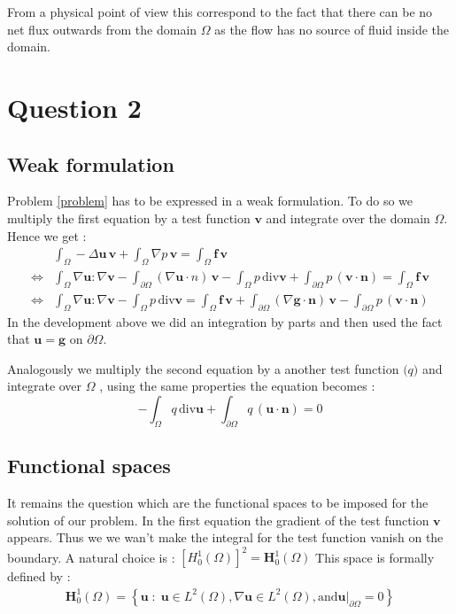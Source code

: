 \documentclass{article}
\begin{document}
From a physical point of view this correspond to the fact that there can be no
net flux outwards from the domain $\Omega$ as the flow has no source of fluid
inside the domain.

\section*{Question 2}
\subsection*{Weak formulation}
Problem \ref{problem} has to be expressed in a weak formulation. To do so we
multiply the first equation by a test function $\mathbf{v}$ and integrate over
the domain $\Omega$. Hence we get :
\begin{align*}
	& \int_{\Omega}-\Delta \mathbf{u} \,\mathbf{v}+\int_{\Omega}\nabla p \,\mathbf{v} = \int_{\Omega}\mathbf{f}\, \mathbf{v} \\
	\Leftrightarrow& \int_{\Omega} \nabla \mathbf{u} \mathbf{:} \nabla \mathbf{v}-\int_{\partial\Omega} (\nabla \mathbf{u}\cdot n)\, \mathbf{v}  -\int_{\Omega} p\, \mathrm{div}\mathbf{v}+\int_{\partial\Omega}p\,(\mathbf{v}\cdot \mathbf{n})=\int_{\Omega}\mathbf{f}\, \mathbf{v} \\
	\Leftrightarrow& \int_{\Omega} \nabla \mathbf{u} \mathbf{:} \nabla \mathbf{v}-\int_{\Omega} p\, \mathrm{div}\mathbf{v}=\int_{\Omega}\mathbf{f}\, \mathbf{v}+\int_{\partial\Omega} (\nabla \mathbf{g}\cdot \mathbf{n})\, \mathbf{v}-\int_{\partial\Omega}p\,(\mathbf{v}\cdot \mathbf{n})   
\end{align*}
In the development above we did an integration by parts and then used the fact
that $\mathbf{u}=\mathbf{g} \textrm{ on } \partial\Omega$.

Analogously we multiply the second equation by a another test function
$\mathbf(q)$ and integrate over $\Omega$ , using the same properties the
equation becomes :
\begin{equation*}
    -\int_{\Omega} q\, \mathrm{div}\mathbf{u}+\int_{\partial\Omega}q\,(\mathbf{u}\cdot \mathbf{n})=0
\end{equation*}

\subsection*{Functional spaces}
It remains the question which are the functional spaces to be imposed for the
solution of our problem. In the first equation the gradient of the
test function $\mathbf{v}$ appears. Thus we we wan't make the integral for
the test function vanish on the boundary. A natural choice is :
$[H^1_0(\Omega)]^2 = \mathbf{H}^1_0(\Omega)$
This space is formally defined by :  
\begin{align*}
	\mathbf{H}^1_0(\Omega) = \left\{\mathbf{u} \;:\; \mathbf{u} \in L^2(\Omega),
	\nabla \mathbf{u} \in L^2(\Omega), \textrm{and}
	\mathbf{u}|_{\partial\Omega}=0 \right\}
\end{align*}
\end{document}
